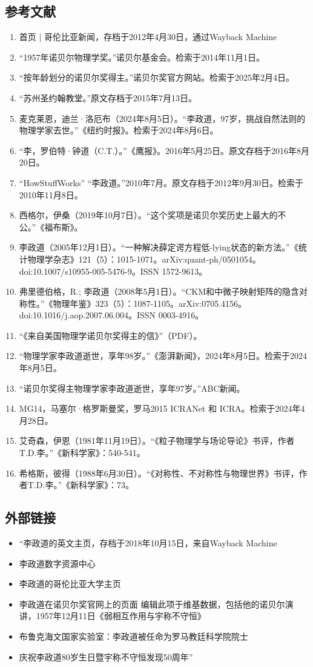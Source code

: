 \subsection{参考文献}  
\begin{enumerate}
\item 首页 | 哥伦比亚新闻，存档于2012年4月30日，通过Wayback Machine  
\item “1957年诺贝尔物理学奖。”诺贝尔基金会。检索于2014年11月1日。  
\item “按年龄划分的诺贝尔奖得主。”诺贝尔奖官方网站。检索于2025年2月4日。  
\item “苏州圣约翰教堂。”原文存档于2015年7月13日。  
\item 麦克莱恩，迪兰·洛厄布（2024年8月5日）。“李政道，97岁，挑战自然法则的物理学家去世。”《纽约时报》。检索于2024年8月6日。  
\item “李，罗伯特·钟道（C.T.）。”《鹰报》。2016年5月25日。原文存档于2016年8月20日。  
\item “HowStuffWorks” “李政道。”2010年7月。原文存档于2012年9月30日。检索于2010年11月8日。  
\item 西格尔，伊桑（2019年10月7日）。“这个奖项是诺贝尔奖历史上最大的不公。”《福布斯》。  
\item 李政道（2005年12月1日）。“一种解决薛定谔方程低-lying状态的新方法。”《统计物理学杂志》121（5）：1015-1071。arXiv:quant-ph/0501054。doi:10.1007/s10955-005-5476-9。ISSN 1572-9613。  
\item 弗里德伯格，R.; 李政道（2008年5月1日）。“CKM和中微子映射矩阵的隐含对称性。”《物理年鉴》323（5）：1087-1105。arXiv:0705.4156。doi:10.1016/j.aop.2007.06.004。ISSN 0003-4916。
\item “《来自美国物理学诺贝尔奖得主的信》”（PDF）。  
\item “物理学家李政道逝世，享年98岁。”《澎湃新闻》，2024年8月5日。检索于2024年8月5日。  
\item “诺贝尔奖得主物理学家李政道逝世，享年97岁。”ABC新闻。  
\item MG14，马塞尔·格罗斯曼奖，罗马2015 ICRANet 和 ICRA。检索于2024年4月28日。  
\item 艾奇森，伊恩（1981年11月19日）。“《粒子物理学与场论导论》书评，作者T.D.李。”《新科学家》：540-541。  
\item 希格斯，彼得（1988年6月30日）。“《对称性、不对称性与物理世界》书评，作者T.D.李。”《新科学家》：73。
\end{enumerate}
\subsection{外部链接}
\begin{itemize}
\item “李政道的英文主页，存档于2018年10月15日，来自Wayback Machine  
\item 李政道数字资源中心  
\item 李政道的哥伦比亚大学主页  
\item 李政道在诺贝尔奖官网上的页面 编辑此项于维基数据，包括他的诺贝尔演讲，1957年12月11日《弱相互作用与宇称不守恒》  
\item 布鲁克海文国家实验室：李政道被任命为罗马教廷科学院院士  
\item 庆祝李政道80岁生日暨宇称不守恒发现50周年”
\end{itemize}
